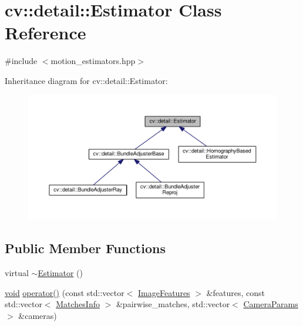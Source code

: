 \hypertarget{classcv_1_1detail_1_1Estimator}{\section{cv\-:\-:detail\-:\-:Estimator Class Reference}
\label{classcv_1_1detail_1_1Estimator}
}


{\ttfamily \#include $<$motion\-\_\-estimators.\-hpp$>$}



Inheritance diagram for cv\-:\-:detail\-:\-:Estimator\-:\nopagebreak
\begin{figure}[H]
\begin{center}
\leavevmode
\includegraphics[width=350pt]{classcv_1_1detail_1_1Estimator__inherit__graph}
\end{center}
\end{figure}
\subsection*{Public Member Functions}
\begin{DoxyCompactItemize}
\item 
virtual \hyperlink{classcv_1_1detail_1_1Estimator_ab542b893998bd59ad667c408bde5db4b}{$\sim$\-Estimator} ()
\item 
\hyperlink{legacy_8hpp_a8bb47f092d473522721002c86c13b94e}{void} \hyperlink{classcv_1_1detail_1_1Estimator_a19fdfd6c4d7e987542d8c6a1facc2352}{operator()} (const std\-::vector$<$ \hyperlink{structcv_1_1detail_1_1ImageFeatures}{Image\-Features} $>$ \&features, const std\-::vector$<$ \hyperlink{structcv_1_1detail_1_1MatchesInfo}{Matches\-Info} $>$ \&pairwise\-\_\-matches, std\-::vector$<$ \hyperlink{structcv_1_1detail_1_1CameraParams}{Camera\-Params} $>$ \&cameras)
\end{DoxyCompactItemize}
